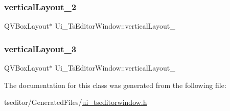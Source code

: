 \mbox{\label{class_ui___ts_editor_window_a76c51335a6ee151d84323a736cb136c3}} 
\subsubsection{\texorpdfstring{verticalLayout\_2}{verticalLayout\_2}}
{\footnotesize\ttfamily Q\+V\+Box\+Layout$\ast$ Ui\+\_\+\+Ts\+Editor\+Window\+::vertical\+Layout\+\_}

\mbox{\label{class_ui___ts_editor_window_a5a4624c461d3d90bf158a26382b6ec52}} 
\subsubsection{\texorpdfstring{verticalLayout\_3}{verticalLayout\_3}}
{\footnotesize\ttfamily Q\+V\+Box\+Layout$\ast$ Ui\+\_\+\+Ts\+Editor\+Window\+::vertical\+Layout\+\_}



The documentation for this class was generated from the following file\+:\begin{DoxyCompactItemize}
\item 
tseditor/\+Generated\+Files/\mbox{\hyperlink{ui__tseditorwindow_8h}{ui\+\_\+tseditorwindow.\+h}}\end{DoxyCompactItemize}
